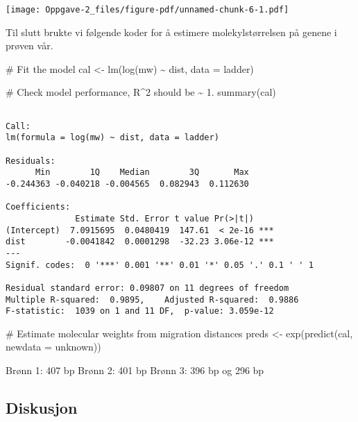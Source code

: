 \documentclass[
  letterpaper,
  DIV=11,
  numbers=noendperiod]{scrreprt}
\newenvironment{Shaded}{\begin{snugshade}}{\end{snugshade}}
\newcommand{\AttributeTok}[1]{\textcolor[rgb]{0.40,0.45,0.13}{#1}}
\newcommand{\CommentTok}[1]{\textcolor[rgb]{0.37,0.37,0.37}{#1}}
\newcommand{\FunctionTok}[1]{\textcolor[rgb]{0.28,0.35,0.67}{#1}}
\newcommand{\NormalTok}[1]{\textcolor[rgb]{0.00,0.23,0.31}{#1}}
\newcommand{\OtherTok}[1]{\textcolor[rgb]{0.00,0.23,0.31}{#1}}
\newcommand{\SpecialCharTok}[1]{\textcolor[rgb]{0.37,0.37,0.37}{#1}}
\begin{document}
\texttt{[image: Oppgave-2\_files/figure-pdf/unnamed-chunk-6-1.pdf]}

Til slutt brukte vi følgende koder for å estimere molekylstørrelsen på
genene i prøven vår.

\begin{Shaded}
\begin{Highlighting}[]
\CommentTok{\# Fit the model}
\NormalTok{cal }\OtherTok{\textless{}{-}} \FunctionTok{lm}\NormalTok{(}\FunctionTok{log}\NormalTok{(mw) }\SpecialCharTok{\textasciitilde{}}\NormalTok{ dist, }\AttributeTok{data =}\NormalTok{ ladder)}

\CommentTok{\# Check model performance, R\^{}2 should be \textasciitilde{} 1.}
\FunctionTok{summary}\NormalTok{(cal)}
\end{Highlighting}
\end{Shaded}

\begin{verbatim}

Call:
lm(formula = log(mw) ~ dist, data = ladder)

Residuals:
      Min        1Q    Median        3Q       Max 
-0.244363 -0.040218 -0.004565  0.082943  0.112630 

Coefficients:
              Estimate Std. Error t value Pr(>|t|)    
(Intercept)  7.0915695  0.0480419  147.61  < 2e-16 ***
dist        -0.0041842  0.0001298  -32.23 3.06e-12 ***
---
Signif. codes:  0 '***' 0.001 '**' 0.01 '*' 0.05 '.' 0.1 ' ' 1

Residual standard error: 0.09807 on 11 degrees of freedom
Multiple R-squared:  0.9895,    Adjusted R-squared:  0.9886 
F-statistic:  1039 on 1 and 11 DF,  p-value: 3.059e-12
\end{verbatim}

\begin{Shaded}
\begin{Highlighting}[]
\CommentTok{\# Estimate molecular weights from migration distances}
\NormalTok{preds }\OtherTok{\textless{}{-}} \FunctionTok{exp}\NormalTok{(}\FunctionTok{predict}\NormalTok{(cal, }\AttributeTok{newdata =}\NormalTok{ unknown)) }
\end{Highlighting}
\end{Shaded}

Brønn 1: 407 bp Brønn 2: 401 bp Brønn 3: 396 bp og 296 bp

\subsection{Diskusjon}\label{diskusjon}
\end{document}
